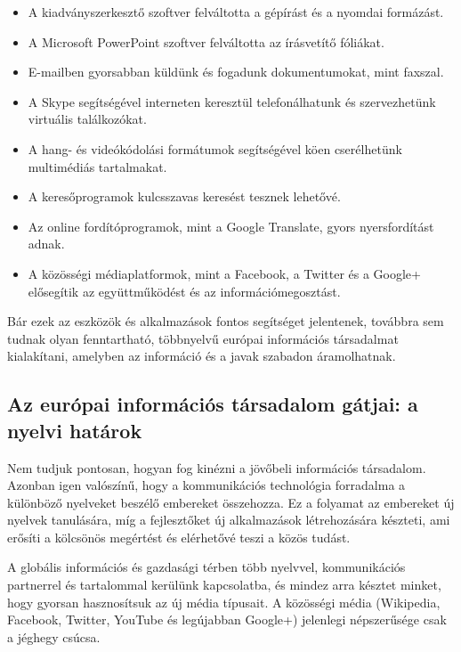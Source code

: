 \begin{multicols}{2}
  \begin{itemize}
  \item A kiadványszerkesztő szoftver felváltotta a gépírást és a nyomdai formázást.
  \item A Microsoft PowerPoint szoftver felváltotta az írásvetítő fóliákat.
  \item E-mailben gyorsabban küldünk és fogadunk dokumentumokat, mint faxszal.
  \item A Skype segítségével interneten ke\-resz\-tül telefonálhatunk és szer\-vez\-he\-tünk virtuális találkozókat.
  \item A hang- és videókódolási formátumok segítségével köen cserélhetünk multimédiás tartalmakat.
  \item A keresőprogramok kulcsszavas ke\-re\-sést tesznek lehetővé.
  \item Az online fordítóprogramok, mint a Google Translate, gyors nyersfordítást adnak.
  \item A közösségi médiaplatformok, mint a Facebook, a Twitter és a Google+ elősegítik az együttműködést és az információmegosztást.
  \end{itemize}

  Bár ezek az eszközök és alkalmazások fontos segítséget jelentenek, továbbra sem tudnak olyan fenntartható, többnyelvű európai információs társadalmat kialakítani, amelyben az információ és a javak szabadon áramolhatnak.

  \subsection{Az európai információs társadalom gátjai: a nyelvi határok}

  Nem tudjuk pontosan, hogyan fog kinézni a jövőbeli információs társadalom. Azonban igen valószínű, hogy a kommunikációs technológia forradalma a különböző nyelveket beszélő embereket összehozza. Ez a folyamat az embereket új nyelvek tanulására, míg a fejlesztőket új alkalmazások létrehozására készteti, ami erő\-sí\-ti a kölcsönös megértést és elérhetővé teszi a közös tudást. 


  A globális információs és gazdasági térben több nyelvvel, kommunikációs partnerrel és tartalommal kerülünk kapcsolatba, és mindez arra késztet minket, hogy gyorsan hasznosítsuk az új média típusait. A közösségi média (Wikipedia, Facebook, Twitter, YouTube és legújabban Google+) jelenlegi népszerűsége csak a jéghegy csúcsa. 


\end{multicols}
